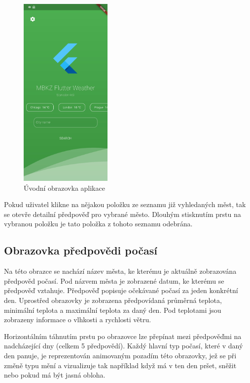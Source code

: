 \documentclass[12pt, a4paper]{article}
\begin{document}
\begin{figure}[h]
    \centering
    \includegraphics[width=0.40\textwidth]{img/app-menu.jpg}
    \caption{Úvodní obrazovka aplikace}
    \label{fig:mesh1}
\end{figure}

Pokud uživatel klikne na nějakou položku ze seznamu již vyhledaných měst, tak se otevře detailní předpověď pro vybrané město. Dlouhým stisknutím prstu na vybranou položku je tato položka z tohoto seznamu odebrána.

\subsection{Obrazovka předpovědi počasí}

Na této obrazce se nachází název města, ke kterému je aktuálně zobrazována předpověd počasí. Pod názvem města je zobrazené datum, ke kterému se předpověď vztahuje. Předpověď popisuje očekávané počasí za jeden konkrétní den. Uprostřed obrazovky je zobrazena předpovídaná průměrná teplota, minimální teplota a maximální teplota za daný den. Pod teplotami jsou zobrazeny informace o vlhkosti a rychlosti větru.

Horizontálním táhnutím prstu po obrazovce lze přepínat mezi předpověďmi na nadcházející dny (celkem 5 předpovědí). Každý hlavní typ počasí, které v daný den panuje, je reprezentován animovaným pozadím této obrazovky, jež se při změně typu mění a vizualizuje tak například když má v ten den pršet, sněžit nebo pokud má být jasná obloha.
\end{document}
